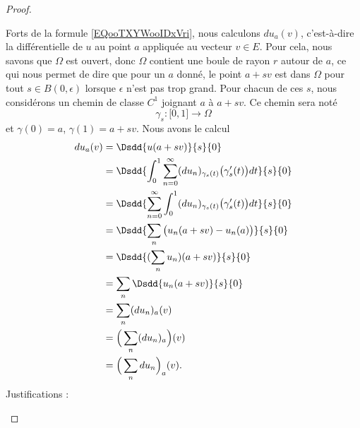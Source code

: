 \begin{proof}
\begin{subproof}
		Forts de la formule \eqref{EQooTXYWooIDxVri}, nous calculons \( du_a(v)\), c'est-à-dire la différentielle de \( u\) au point \( a\) appliquée au vecteur \( v\in E\). Pour cela, nous savons que \( \Omega\) est ouvert, donc \( \Omega\) contient une boule de rayon \( r\) autour de \( a\), ce qui nous permet de dire que pour un \( a \) donné, le point \( a+sv\) est dans \( \Omega\) pour tout \( s\in B(0,\epsilon)\) lorsque \( \epsilon\) n'est pas trop grand. Pour chacun de ces \( s\), nous considérons un chemin de classe \( C^1\) joignant \( a\) à \( a+sv\). Ce chemin sera noté
		\begin{equation}
			\gamma_s\colon \mathopen[ 0 , 1 \mathclose]\to \Omega
		\end{equation}
		et \( \gamma(0)=a\), \( \gamma(1)=a+sv\). Nous avons le calcul
		\begin{subequations}
			\begin{align}
				du_a(v) & =\Dsdd{ u(a+sv) }{s}{0}                                                                                                    \\
				        & =\Dsdd{ \int_0^1\sum_{n=0}^{\infty}(du_n)_{\gamma_s(t)}\big( \gamma_s'(t) \big)dt }{s}{0}                                  \\
				        & =\Dsdd{ \sum_{n=0}^{\infty} \int_0^1(du_n)_{\gamma_s(t)}\big( \gamma'_s(t) \big)dt  }{s}{0}    \label{SUBEQooFSPSooCPErXj} \\
				        & =\Dsdd{ \sum_n\big( u_n(a+sv)-u_n(a) \big) }{s}{0}                                                                         \\
				        & =\Dsdd{ (\sum_nu_n)(a+sv) }{s}{0}                                                                                          \\
				        & =\sum_n\Dsdd{ u_n(a+sv) }{s}{0}    \label{SUBEQooDQODooIPMfDo}                                                             \\
				        & =\sum_n(du_n)_a(v)                                                                                                         \\
				        & =\Big( \sum_n(du_n)_a \Big)(v)                                                                                             \\
				        & =\Big( \sum_ndu_n \Big)_a(v)\label{SUBEQooQGOQooLvXuaX}.
			\end{align}
		\end{subequations}
		Justifications :
		\begin{itemize}

\end{itemize}
\end{subproof}
\end{proof}
